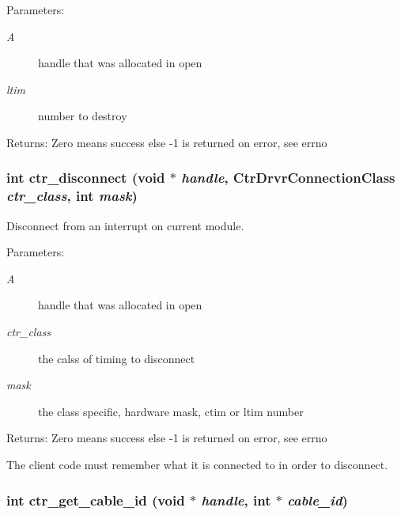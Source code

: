 \begin{Desc}
\item[Parameters:]
\begin{description}
\item[{\em A}]handle that was allocated in open \item[{\em ltim}]number to destroy \end{description}
\end{Desc}
\begin{Desc}
\item[Returns:]Zero means success else -1 is returned on error, see errno \end{Desc}
\subsubsection{\setlength{\rightskip}{0pt plus 5cm}int ctr\_\-disconnect (void $\ast$ {\em handle}, Ctr\-Drvr\-Connection\-Class {\em ctr\_\-class}, int {\em mask})}\label{libctr_8doxygen_ebe58613eb6fa7c893c1139df04634eb}


Disconnect from an interrupt on current module. 

\begin{Desc}
\item[Parameters:]
\begin{description}
\item[{\em A}]handle that was allocated in open \item[{\em ctr\_\-class}]the calss of timing to disconnect \item[{\em mask}]the class specific, hardware mask, ctim or ltim number \end{description}
\end{Desc}
\begin{Desc}
\item[Returns:]Zero means success else -1 is returned on error, see errno\end{Desc}
The client code must remember what it is connected to in order to disconnect. 
\subsubsection{\setlength{\rightskip}{0pt plus 5cm}int ctr\_\-get\_\-cable\_\-id (void $\ast$ {\em handle}, int $\ast$ {\em cable\_\-id})}\label{libctr_8doxygen_60d45f0e1514800900d22abf56fcba34}


